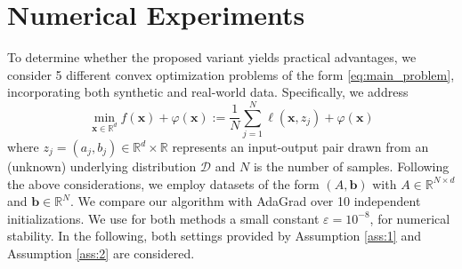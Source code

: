 \documentclass[11pt]{article}
\theoremstyle{plain}
\theoremstyle{definition}
\theoremstyle{remark}
\newcommand{\MB}[1]{\textcolor{red}{#1}}
\newcommand{\R}{\mathbb{R}}
\newcommand{\m}{d}
\newcommand{\bx}{\bm{x}}
\begin{document}
\section{Numerical Experiments}\label{4}
\label{sec:exps}
To determine whether the proposed variant yields practical advantages, we consider 5 different convex optimization problems of the form \eqref{eq:main_problem}, incorporating both synthetic and real-world data. Specifically, we address
\begin{equation}
    \min_{\bx\in\R^\m} f(\bx) + \varphi(\bx) := \frac{1}{N}\sum_{j=1}^N \ell(\bx, z_j) + \varphi(\bx)
\end{equation}
where $z_j = (a_j, b_j)\in\R^\m\times\R$ represents an input-output pair drawn from an (unknown) underlying distribution $\mathcal{D}$ and $N$ is the number of samples.
Following the above considerations, we employ datasets of the form $(A, \boldsymbol{b})$ with $A \in \R^{N \times \m}$ and $\boldsymbol{b} \in \R^{N}$. We compare our algorithm with AdaGrad over 10 independent initializations. We use for both methods a small constant $\varepsilon = 10^{-8}$, for numerical stability.  
%
In the following, both settings provided by Assumption \ref{ass:1} and Assumption \ref{ass:2} are considered.
\end{document}
